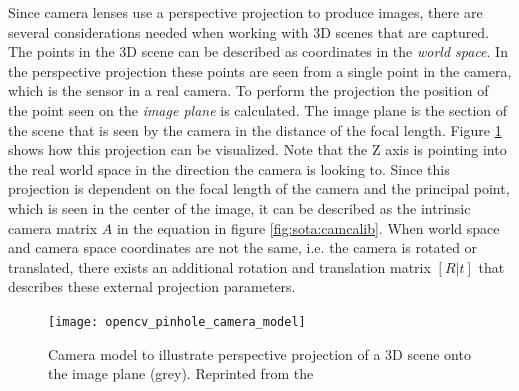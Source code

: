 Since camera lenses use a perspective projection to produce images, 
there are several considerations needed when working with \ac{3D} scenes that are captured.
The points in the 3D scene can be described as coordinates in the \emph{world space}.
In the perspective projection these points are seen from a single point in the camera, 
which is the sensor in a real camera.
To perform the projection the position of the point seen on the \emph{image plane} is calculated.
The image plane is the section of the scene that is seen by the camera in the distance of the focal length.
Figure \ref{fig:sota:camerprojection} shows how this projection can be visualized.
Note that the Z axis is pointing into the real world space in the direction the camera is looking to.
Since this projection is dependent on the focal length of the camera and the principal point, which is seen in the center of the image, it can be described as the intrinsic camera matrix $ A $ in the equation in figure \ref{fig:sota:camcalib}.
When world space and camera space coordinates are not the same, i.e. the camera is rotated or translated, there exists an additional rotation and translation matrix $ [R|t] $ that describes these external projection parameters.

\begin{figure}[hbt]
    \centering
    \texttt{[image: opencv\_pinhole\_camera\_model]}
        \caption[Camera model to illustrate perspective projection]{Camera model to illustrate perspective projection of a 3D scene onto the image plane (grey). Reprinted from the \textcite{opencv2018calibration}}
    \label{fig:sota:camerprojection}
\end{figure}

